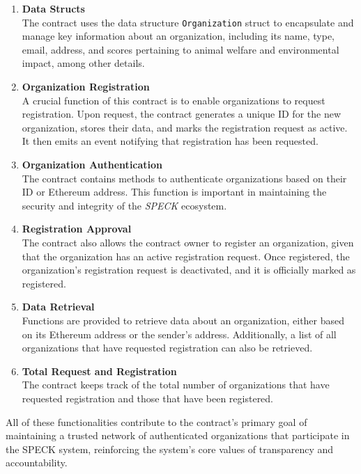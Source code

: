 \documentclass[oneside,a4paper,12pt, colorinlistoftodos]{article} %
\begin{document}
\begin{enumerate}
    \item \textbf{Data Structs} \\
    The contract uses the data structure \texttt{Organization} struct to encapsulate and manage key information about an organization, including its name, type, email, address, and scores pertaining to animal welfare and environmental impact, among other details.
    \item \textbf{Organization Registration} \\
    A crucial function of this contract is to enable organizations to request registration. Upon request, the contract generates a unique ID for the new organization, stores their data, and marks the registration request as active. It then emits an event notifying that registration has been requested.
    \item \textbf{Organization Authentication} \\ 
    The contract contains methods to authenticate organizations based on their ID or Ethereum address. This function is important in maintaining the security and integrity of the \textit{SPECK} ecosystem.
    \item \textbf{Registration Approval} \\
    The contract also allows the contract owner to register an organization, given that the organization has an active registration request. Once registered, the organization's registration request is deactivated, and it is officially marked as registered.
    \item \textbf{Data Retrieval} \\
    Functions are provided to retrieve data about an organization, either based on its Ethereum address or the sender's address. Additionally, a list of all organizations that have requested registration can also be retrieved.
    \item \textbf{Total Request and Registration} \\
    The contract keeps track of the total number of organizations that have requested registration and those that have been registered.
    
\end{enumerate}

All of these functionalities contribute to the contract's primary goal of maintaining a trusted network of authenticated organizations that participate in the SPECK system, reinforcing the system's core values of transparency and accountability.
\end{document}
